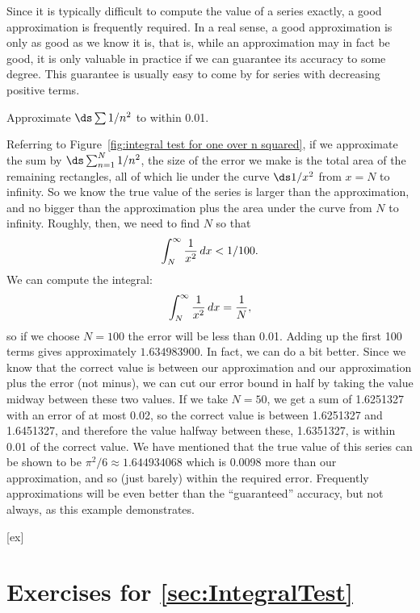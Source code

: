 Since it is typically difficult to compute the value of a series
exactly, a good approximation is frequently required. In a real sense,
a good approximation is only as good as we know it is, that is, while
an approximation may in fact be good, it is only valuable in practice
if we can guarantee its accuracy to some degree. This guarantee is
usually easy to come by for series with decreasing positive terms.

\begin{example}{}{}
Approximate $\ds \sum 1/n^2$ to within 0.01.
\end{example}
\begin{solution}
Referring to Figure~\ref{fig:integral test for one over n squared},
if we approximate the sum by $\ds \sum_{n=1}^N 1/n^2$, the size of the error we make is the
total area of the remaining rectangles, all of which lie under the
curve $\ds 1/x^2$ from $x=N$ to infinity. So we know the true value of
the series is larger than the approximation, and no bigger than the
approximation plus the area under the curve from $N$ to
infinity. Roughly, then, we need to find $N$ so that 
$$\int_N^\infty {1\over x^2}\,dx < 1/100.$$
We can compute the integral:
$$\int_N^\infty {1\over x^2}\,dx = {1\over N},$$ 
so if we choose $N=100$ the error will be less than 0.01.  Adding up the first 100 terms
gives approximately $1.634983900$. In fact, we can do a bit better. Since we know that
the correct value is between our approximation and our approximation plus the error
(not minus), we can cut our error bound in half by taking the value midway between
these two values. If we take $N=50$, we get a sum of 1.6251327 with an error of at most 0.02,
so the correct value is between 1.6251327 and 1.6451327, and therefore the value
halfway between these, 1.6351327, is within 0.01 of the correct value. We have mentioned
that the true value of this series can be shown to be $\pi^2/6\approx 1.644934068$ which
is 0.0098 more than our approximation, and so (just barely) within the required error.
Frequently approximations will be even better than the
``guaranteed'' accuracy, but not always, as this example demonstrates.
\end{solution}

[ex]
\section*{Exercises for \ref{sec:IntegralTest}}

